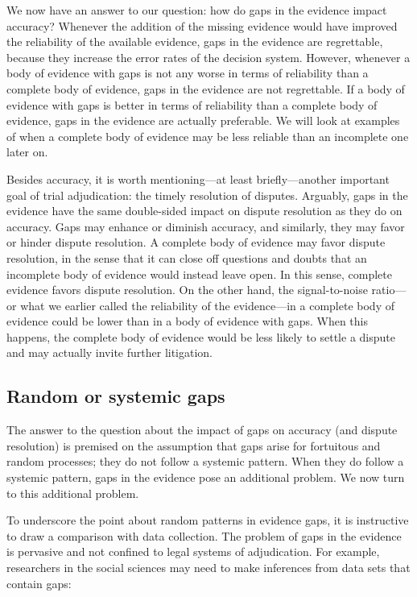 \documentclass[
  10pt,
  dvipsnames,enabledeprecatedfontcommands]{scrartcl}
\begin{document}
We now have an answer to our question: how do gaps in the evidence
impact accuracy? Whenever the addition of the missing evidence would
have improved the reliability of the available evidence, gaps in the
evidence are regrettable, because they increase the error rates of the
decision system. However, whenever a body of evidence with gaps is not
any worse in terms of reliability than a complete body of evidence, gaps
in the evidence are not regrettable. If a body of evidence with gaps is
better in terms of reliability than a complete body of evidence, gaps in
the evidence are actually preferable. We will look at examples of when a
complete body of evidence may be less reliable than an incomplete one
later on.

Besides accuracy, it is worth mentioning---at least briefly---another
important goal of trial adjudication: the timely resolution of disputes.
Arguably, gaps in the evidence have the same double-sided impact on
dispute resolution as they do on accuracy. Gaps may enhance or diminish
accuracy, and similarly, they may favor or hinder dispute resolution. A
complete body of evidence may favor dispute resolution, in the sense
that it can close off questions and doubts that an incomplete body of
evidence would instead leave open. In this sense, complete evidence
favors dispute resolution. On the other hand, the signal-to-noise
ratio---or what we earlier called the reliability of the evidence---in a
complete body of evidence could be lower than in a body of evidence with
gaps. When this happens, the complete body of evidence would be less
likely to settle a dispute and may actually invite further litigation.

\hypertarget{random-or-systemic-gaps}{%
\subsection{Random or systemic gaps}\label{random-or-systemic-gaps}}

The answer to the question about the impact of gaps on accuracy (and
dispute resolution) is premised on the assumption that gaps arise for
fortuitous and random processes; they do not follow a systemic pattern.
When they do follow a systemic pattern, gaps in the evidence pose an
additional problem. We now turn to this additional problem.

To underscore the point about random patterns in evidence gaps, it is
instructive to draw a comparison with data collection. The problem of
gaps in the evidence is pervasive and not confined to legal systems of
adjudication. For example, researchers in the social sciences may need
to make inferences from data sets that contain gaps:
\end{document}
